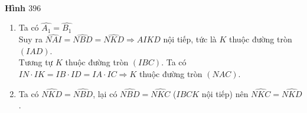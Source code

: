 \begin{bt}
{\begin{center}
\\
			\centering\textbf{Hình $396$}
	\end{center}
			\begin{enumerate}
				\item Ta có $\widehat{A_1}=\widehat{B_1}$\\
				Suy ra $\widehat{NAI}=\widehat{NBD}=\widehat{NKD}\Rightarrow AIKD$ nội tiếp, tức là $K$ thuộc đường tròn $(IAD)$.\\
				Tương tự $K$ thuộc đường tròn $(IBC)$. Ta có\\
				$IN\cdot IK=IB\cdot ID=IA\cdot IC\Rightarrow K$ thuộc đường tròn $(NAC)$.
				\item Ta có $\widehat{NKD}=\widehat{NBD}$, lại có $\widehat{NBD}=\widehat{NKC}$ ($IBCK$ nội tiếp) nên $\widehat{NKC}=\widehat{NKD}$.
			\end{enumerate}
		
	}
\end{bt}
